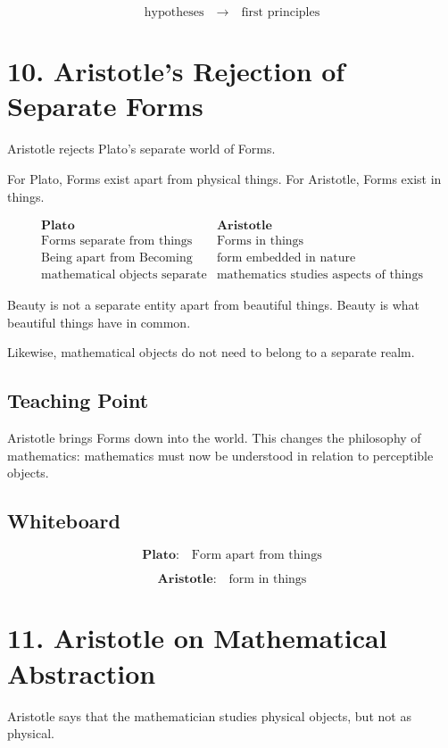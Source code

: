 \documentclass[11pt]{article}
\begin{document}
\[
\text{hypotheses}
\quad \longrightarrow \quad
\text{first principles}
\]

\section*{10. Aristotle's Rejection of Separate Forms}

Aristotle rejects Plato's separate world of Forms.

For Plato, Forms exist apart from physical things. For Aristotle, Forms exist in things.

\[
\begin{array}{c|c}
\textbf{Plato} & \textbf{Aristotle} \\
\hline
\text{Forms separate from things} & \text{Forms in things} \\
\text{Being apart from Becoming} & \text{form embedded in nature} \\
\text{mathematical objects separate} & \text{mathematics studies aspects of things}
\end{array}
\]

Beauty is not a separate entity apart from beautiful things. Beauty is what beautiful things
have in common.

Likewise, mathematical objects do not need to belong to a separate realm.

\subsection*{Teaching Point}

Aristotle brings Forms down into the world. This changes the philosophy of mathematics:
mathematics must now be understood in relation to perceptible objects.

\subsection*{Whiteboard}

\[
\textbf{Plato:}
\quad
\text{Form apart from things}
\]

\[
\textbf{Aristotle:}
\quad
\text{form in things}
\]

\section*{11. Aristotle on Mathematical Abstraction}

Aristotle says that the mathematician studies physical objects, but not as physical.
\end{document}
